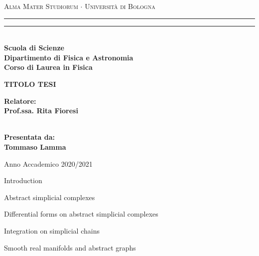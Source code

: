 \documentclass[12pt,a4paper]{report}
\begin{document}
\begin{titlepage}
   \begin{center}
        {{\Large{\textsc{Alma Mater Studiorum $\cdot$ Universit\`a di Bologna}}}} 
        \rule[0.1cm]{15.8cm}{0.1mm}
        \rule[0.5cm]{15.8cm}{0.6mm}
        \\\vspace{3mm}
        {\small{\bf Scuola di Scienze \\ 
        Dipartimento di Fisica e Astronomia\\
        Corso di Laurea in Fisica}}
    \end{center}
    \vspace{23mm}
    \begin{center}
        {{\LARGE{\bf TITOLO TESI}}\\}
    \end{center}
    \vspace{50mm} \par \noindent
    \begin{minipage}[t]{0.47\textwidth}
        {\large{\bf Relatore: \vspace{2mm}\\
        Prof.ssa. Rita Fioresi\\\\
        }}
    \end{minipage}
    \hfill
    \begin{minipage}[t]{0.47\textwidth}\raggedleft
        {\large{\bf Presentata da:
        \vspace{2mm}\\
        Tommaso Lamma}}
    \end{minipage}
    \vspace{40mm}
    \begin{center}
        Anno Accademico 2020/2021
    \end{center}
\end{titlepage}

\tableofcontents

\begin{chapter}{Introduction}
    \begin{section}{Abstract simplicial complexes}
    \end{section}
    \begin{section}{Differential forms on abstract simplicial complexes}
    \end{section}
    \begin{section}{Integration on simplicial chains}
    \end{section}
    \begin{section}{Smooth real manifolds and abstract graphs}
    \end{section}
\end{chapter}
\end{document}
